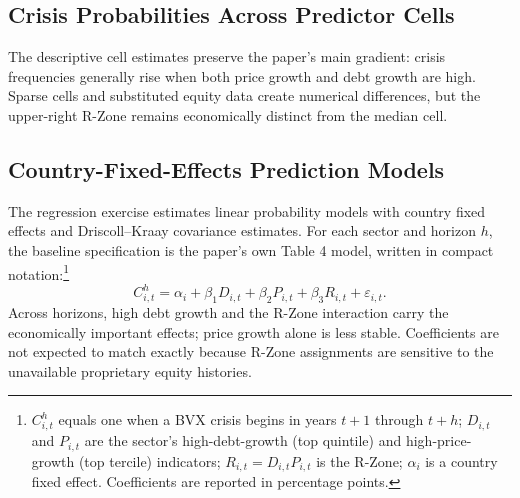 \documentclass[11pt]{article}
\begin{document}
\clearpage
\subsection{Crisis Probabilities Across Predictor Cells}

The descriptive cell estimates preserve the paper's main gradient: crisis
frequencies generally rise when both price growth and debt growth are high.
Sparse cells and substituted equity data create numerical differences, but the
upper-right R-Zone remains economically distinct from the median cell.

\begingroup
{}
\label{tab:table3-historical}

\endgroup

\clearpage
\subsection{Country-Fixed-Effects Prediction Models}

The regression exercise estimates linear probability models with country fixed
effects and Driscoll--Kraay covariance estimates. For each sector and horizon
$h$, the baseline specification is the paper's own Table 4 model, written in
compact notation:\footnote{$C^{h}_{i,t}$ equals one when a BVX crisis begins
in years $t+1$ through $t+h$; $D_{i,t}$ and $P_{i,t}$ are the sector's
high-debt-growth (top quintile) and high-price-growth (top tercile)
indicators; $R_{i,t} = D_{i,t} P_{i,t}$ is the R-Zone; $\alpha_i$ is a
country fixed effect. Coefficients are reported in percentage points.}
\begin{equation}
\label{eq:baseline}
C^{h}_{i,t} = \alpha_i + \beta_1 D_{i,t} + \beta_2 P_{i,t} + \beta_3 R_{i,t}
+ \varepsilon_{i,t}.
\end{equation}
Across horizons, high debt growth and the R-Zone interaction carry the
economically important effects; price growth alone is less stable.
Coefficients are not expected to match exactly because R-Zone assignments are
sensitive to the unavailable proprietary equity histories.
\end{document}
